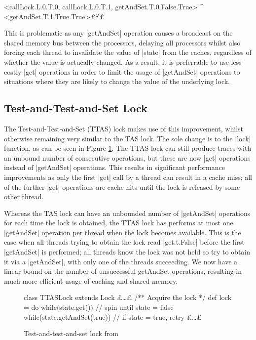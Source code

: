 \begin{cspm}
  <callLock.L.0.T.0, callLock.L.0.T.1, getAndSet.T.0.False.True> ^ <getAndSet.T.1.True.True>£$^\omega$£
\end{cspm}

This is problematic as any |getAndSet| operation causes a broadcast on the shared memory bus between the processors, delaying all processors whilst also forcing each thread to invalidate the value of |state| from the caches, regardless of whether the value is actucally changed. As a result, it is preferrable to use less costly |get| operations in order to limit the usage of |getAndSet| operations to situations where they are likely to change the value of the underlying lock.  


\subsection{Test-and-Test-and-Set Lock}

The Test-and-Test-and-Set (TTAS) lock makes use of this improvement, whilst otherwise remaining very similar to the TAS lock. The sole change is to the |lock| function, as can be seen in Figure \ref{scala:TTAS}. The TTAS lock can still produce traces with an unbound number of consecutive operations, but these are now |get| operations instead of |getAndSet| operations. This results in significant performance  improvements as only the first |get| call by a thread can result in a cache miss; all of the further |get| operations are cache hits until the lock is released by some other thread.

Whereas the TAS lock can have an unbounded number of |getAndSet| operations for each time the lock is obtained, the TTAS lock has performs at most one |getAndSet| operation per thread when the lock becomes available. This is the case when all threads trying to obtain the lock read |get.t.False| before the first |getAndSet| is performed; all threads know the lock was not held so try to obtain it via a |getAndSet|, with only one of the threads succeeding. We now have a linear bound on the number of unsuccessful getAndSet operations, resulting in much more efficient usage of caching and shared memory.

\begin{figure}
  \begin{scala}
    class TTASLock extends Lock{ 
      £\dots£
      /** Acquire the lock */
      def lock = 
        do{
          while(state.get()){ } // spin until state = false
        } while(state.getAndSet(true)) // if state = true, retry
      £\dots£
    }
  \end{scala}
  \caption{Test-and-test-and-set lock from \cite{CADS}  \label{scala:TTAS}}
\end{figure}

